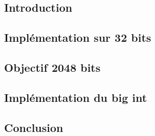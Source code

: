 \subsection{Introduction}
\subsection{Implémentation sur 32 bits}
\subsection{Objectif 2048 bits}
\subsection{Implémentation du big int}
\subsection{Conclusion}

